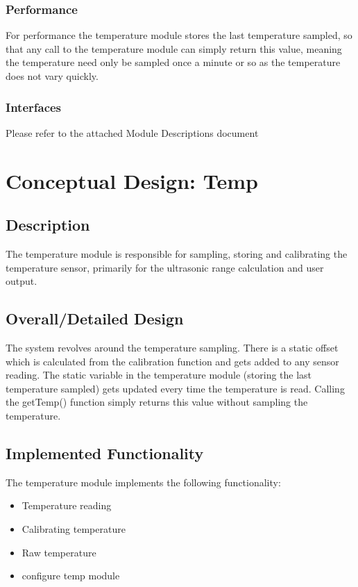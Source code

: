 \documentclass[]{report}
\begin{document}
\subsubsection{Performance}
For performance the temperature module stores the last temperature sampled, so that any call to the temperature module can simply return this value, meaning the temperature need only be sampled once a minute or so as the temperature does not vary quickly.

\subsubsection{Interfaces}
Please refer to the attached Module Descriptions document

\section{Conceptual Design: Temp}
\subsection{Description}
The temperature module is responsible for sampling, storing and calibrating the temperature sensor, primarily for the ultrasonic range calculation and user output.

\subsection{Overall/Detailed Design}
The system revolves around the temperature sampling. There is a static offset which is calculated from the calibration function and gets added to any sensor reading. The static variable in the temperature module (storing the last temperature sampled) gets updated every time the temperature is read. Calling the getTemp() function simply returns this value without sampling the temperature.

\subsection{Implemented Functionality}
The temperature module implements the following functionality:
\begin{itemize}
	\item Temperature reading
	\item Calibrating temperature
	\item Raw temperature
	\item configure temp module
\end{itemize}
\end{document}
